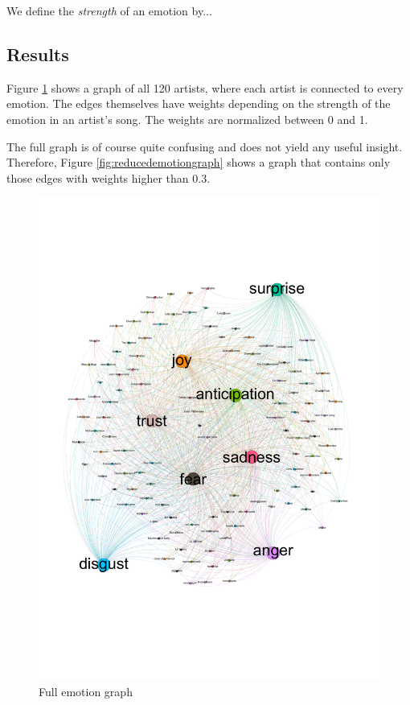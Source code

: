 \documentclass[10pt,a4paper]{article}
\begin{document}
	We define the \textit{strength} of an emotion by...
	
		\subsection{Results}
		Figure \ref{fig:emotiongraph} shows a graph of all 120 artists, where each artist is connected to every emotion. The edges themselves have weights depending on the strength of the emotion in an artist's song. The weights are normalized between 0 and 1.
		
		The full graph is of course quite confusing and does not yield any useful insight. Therefore, Figure \ref{fig:reducedemotiongraph} shows a graph that contains only those edges with weights higher than $0.3$.
		
		\begin{figure}[htb]
			\centering
			\includegraphics[trim=0mm 50mm 0mm 50mm, clip, width=0.7\linewidth]{data/emotion_graph}
			\caption{Full emotion graph}
			\label{fig:emotiongraph}
		\end{figure}
		
\end{document}
